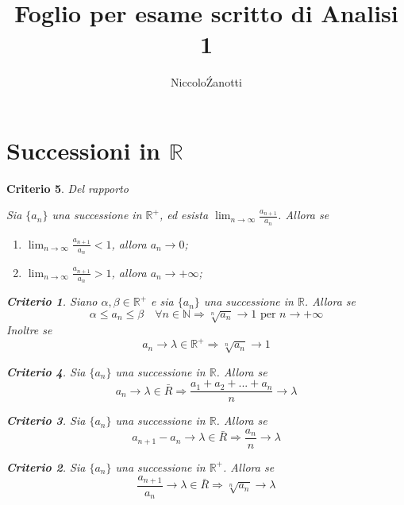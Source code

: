 \documentclass[a4paper, titlepage]{report}%
\theoremstyle{definition} %
\theoremstyle{plain}
\theoremstyle{plain}
\theoremstyle{remark}
\theoremstyle{remark}
\theoremstyle{plain}
\newtheorem*{criterio}{Criterio}
\theoremstyle{plain}
\theoremstyle{plain}
\theoremstyle{plain}
\theoremstyle{plain}
\begin{document}
    \title{Foglio per esame scritto di Analisi 1}
    \author{Niccolo\' Zanotti}
    \maketitle


\section*{Successioni in $\mathbb{R}$}
\begin{criterio}{Del rapporto}

    Sia ${\{ a_n \}}$ una successione in $\mathbb{R^+}$, ed esista
     $\lim_{n \to \infty} \frac{a_{n+1}}{a_n}$. Allora se 
     \begin{enumerate}
         \item $\lim_{n \to \infty} \frac{a_{n+1}}{a_n} < 1$,
               allora $a_n \rightarrow 0$;
        \item $\lim_{n \to \infty} \frac{a_{n+1}}{a_n} > 1$,
        allora $a_n \rightarrow +\infty$;
     \end{enumerate}
\begin{criterio}{}
    
    Siano $\alpha,\beta \in \mathbb{R^+}$ e sia ${\{ a_n \}}$ 
    una successione in $\mathbb{R}$. Allora se
\[
    \alpha \leq a_n \leq \beta \quad \forall n \in \mathbb{N}  
    \Longrightarrow \sqrt[n]{a_n} \rightarrow 1 \text{ per }
     n \rightarrow +\infty
\]
Inoltre se
\[
    a_n \rightarrow \lambda \in \mathbb{R^+} \Longrightarrow 
    \sqrt[n]{a_n} \rightarrow 1
\]
\end{criterio}
\begin{criterio}{}
    
    Sia $\{a_n\}$ una successione in $\mathbb{R}$. Allora se
\[
     a_n \rightarrow \lambda \in \bar{R} \Longrightarrow 
     \frac{a_1+a_2+ ... + a_n}{n} \rightarrow \lambda  
\]
\begin{criterio}
    
    Sia $\{a_n\}$ una successione in $\mathbb{R}$. Allora se
\[
     a_{n+1}-a_n \rightarrow \lambda \in \bar{R} \Longrightarrow 
     \frac{a_n}{n} \rightarrow \lambda       
\]
\begin{criterio}
    
    Sia $\{a_n\}$ una successione in $\mathbb{R^+}$. Allora se
\[
     \frac{a_{n+1}}{a_n} \rightarrow \lambda \in \bar{R} \Longrightarrow
     \sqrt[n]{a_n} \rightarrow \lambda    
\]

\end{criterio}
    
\end{criterio}


\end{criterio}

   

\end{criterio}
\end{document}
